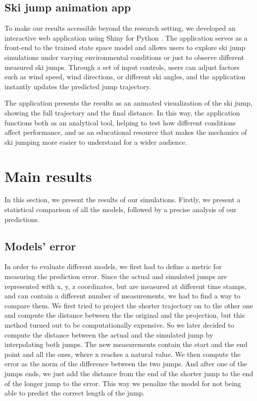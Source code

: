 \documentclass[sigconf,natbib=false, language=english]{acmart}
\begin{document}
\subsection{Ski jump animation app}

To make our results accessible beyond the research setting, we developed an 
interactive web application using Shiny for Python \cite{shiny_python}. The application serves as a 
front-end to the trained state space model and allows users to explore ski jump 
simulations under varying environmental conditions or just to observe different 
measured ski jumps. Through a set of input controls, users can adjust factors such 
as wind speed, wind directions, or different ski angles, and the application instantly 
updates the predicted jump trajectory.

The application presents the results as an animated visualization of the ski jump, 
showing the full trajectory and the final distance. In this way, the application 
functions both as an analytical tool, helping to test how different conditions affect 
performance, and as an educational resource that makes the mechanics of ski jumping 
more easier to understand for a wider audience.

\section{Main results}\label{sec:results}
In this section, we present the results of our simulations. Firstly, we present a 
statistical comparison of all the models, followed by a precise analysis of our 
predictions.


\subsection{Models' error}

In order to evaluate different models, we first had to define a metric for measuring the prediction error.
Since the actual and simulated jumps are represented with x, y, z coordinates, but are measured at different time stamps,
and can contain a different number of measurements, we had to find a way to compare them. We first tried to project
the shorter trajectory on to the other one and compute the distance between the the original and the projection, 
but this method turned out to be computationally expensive. So we later decided to compute the distance between 
the actual and the simulated jump by interpolating both jumps. The new measurements contain the start and the end point
and all the ones, where x reaches a natural value. We then compute the error as the norm of the difference between the two jumps.
And after one of the jumps ends, we just add the distance from the end of the shorter jump to the end of the longer jump
to the error. This way we penalize the model for not being able to predict the correct length of the jump.
\end{document}
